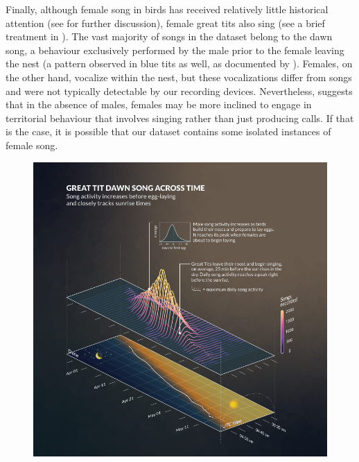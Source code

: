 Finally, although female song in birds has received relatively little historical attention (see \cite{langmore2020, odom2018, riebel2005} for further discussion), female great tits also sing (see a brief treatment in \cite{gompertz1961, hinde1952}). The vast majority of songs in the dataset belong to the dawn song, a behaviour exclusively performed by the male prior to the female leaving the nest (a pattern observed in blue tits as well, as documented by \cite{sierro2022}). Females, on the other hand, vocalize within the nest, but these vocalizations \parencite{gorissen2005, gorissen2004} differ from songs and were not typically detectable by our recording devices. Nevertheless, \cite{hinde1952} suggests that in the absence of males, females may be more inclined to engage in territorial behaviour that involves singing rather than just producing calls. If that is the case, it is possible that our dataset contains some isolated instances of female song.

\begin{figure}[th!]
    \centering
    \includegraphics[width=\linewidth]{figures/chapter_3/FIG4-AB.pdf}
    \label{c3_fig:timing}
\end{figure}

